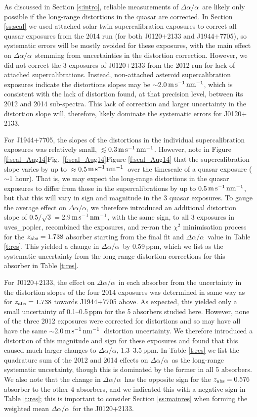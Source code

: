 \documentclass[fleqn,usenatbib,usedcolumn]{mnras}
\renewcommand{\la}{\lesssim} %
\newcommand{\Sref}[1]{Section \ref{#1}}
\newcommand{\Tref}[1]{Table \ref{#1}}
\newcommand{\Fref}[1]{\ifhmode \ifnum\spacefactor=1001 Figure \ref{#1}\else Fig.\ \ref{#1}\fi \else Figure \ref{#1}\fi}
\newcommand{\ms}{\ensuremath{\textrm{m\,s}^{-1}}}
\newcommand{\zab}{\ensuremath{z_\textrm{\scriptsize abs}}}
\newcommand{\daa}{\ensuremath{\Delta\alpha/\alpha}}
\newcommand{\msnm}{\ensuremath{\ms\,\textrm{nm}^{-1}}}
\begin{document}
As discussed in \Sref{s:intro}, reliable measurements of \daa\ are likely only possible if the long-range distortions in the quasar are corrected. In \Sref{ss:scal} we used attached solar twin supercalibration exposures to correct all quasar exposures from the 2014 run (for both J0120$+$2133 and J1944$+$7705), so systematic errors will be mostly avoided for these exposures, with the main effect on \daa\ stemming from uncertainties in the distortion correction. However, we did not correct the 3 exposures of J0120$+$2133 from the 2012 run for lack of attached supercalibrations. Instead, non-attached asteroid supercalibration exposures indicate the distortions slopes may be $\sim$2.0\,\msnm, which is consistent with the lack of distortion found, at that precision level, between its 2012 and 2014 sub-spectra. This lack of correction and larger uncertainty in the distortion slope will, therefore, likely dominate the systematic errors for J0120$+$2133.

For J1944$+$7705, the slopes of the distortions in the individual supercalibration exposures was relatively small, $\la$0.3\,\msnm. However, note in \Fref{f:scal_Aug14} that the supercalibration slope varies by up to $\approx$0.5\,\msnm\ over the timescale of a quasar exposure ($\sim$1 hour). That is, we may expect the long-range distortions in the quasar exposures to differ from those in the supercalibrations by up to 0.5\,\msnm, but that this will vary in sign and magnitude in the 3 quasar exposures. To gauge the average effect on \daa, we therefore introduced an additional distortion slope of $0.5/\sqrt{3}=2.9$\,\msnm, with the same sign, to all 3 exposures in {\sc uves\_popler}, recombined the exposures, and re-ran the $\chi^2$ minimisation process for the $\zab=1.738$ absorber starting from the final fit and \daa\ value in \Tref{t:res}. This yielded a change in \daa\ by 0.59\,ppm, which we list as the systematic uncertainty from the long-range distortion corrections for this absorber in \Tref{t:res}.

For J0120$+$2133, the effect on \daa\ in each absorber from the uncertainty in the distortion slopes of the four 2014 exposures was determined in same way as for $\zab=1.738$ towards J1944$+$7705 above. As expected, this yielded only a small uncertainty of 0.1--0.5\,ppm for the 5 absorbers studied here. However, none of the three 2012 exposures were corrected for distortions and so may have all have the same $\sim$2.0\,\msnm\ distortion uncertainty. We therefore introduced a distortion of this magnitude and sign for these exposures and found that this caused much larger changes to \daa, 1.3--3.5\,ppm. In \Tref{t:res} we list the quadrature sum of the 2012 and 2014 effects on \daa\ as the long-range systematic uncertainty, though this is dominated by the former in all 5 absorbers. We also note that the change in \daa\ has the opposite sign for the $\zab=0.576$ absorber to the other 4 absorbers, and we indicated this with a negative sign in \Tref{t:res}; this is important to consider \Sref{ss:mainres} when forming the weighted mean \daa\ for the J0120$+$2133.
\end{document}
